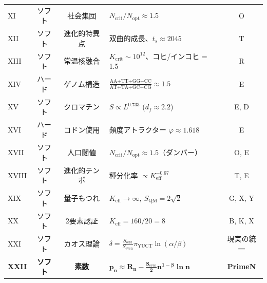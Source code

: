 \documentclass[12pt,a4paper]{article}
\begin{document}
\begin{table}[htbp]
\begin{tabular}{l c c p{3.8cm} c}
		XI  & ソフト & 社会集団 & \(N_{\mathrm{crit}}/N_{\mathrm{opt}} \approx 1.5\) & O \\
		XII & ソフト & 進化的特異点 & 双曲的成長、\(t_s \approx 2045\) & T \\
		XIII& ソフト & 常温核融合 & \(K_{\mathrm{crit}} \sim 10^{12}\)、コヒ/インコヒ = 1.5 & R \\
		XIV & ハード & ゲノム構造 & \(\frac{\text{AA+TT+GG+CC}}{\text{AT+TA+GC+CG}} \approx 1.5\) & E \\
		XV  & ソフト & クロマチン & \(S \propto L^{0.733}\) (\(d_f \approx 2.2\)) & E, D \\
		XVI & ハード & コドン使用 & 頻度アトラクター \(\varphi \approx 1.618\) & E \\
		XVII& ソフト & 人口閾値 & \(N_{\mathrm{crit}}/N_{\mathrm{opt}} \approx 1.5\)（ダンバー） & O, E \\
		XVIII&ソフト & 進化的テンポ & 種分化率 \(\propto K_{\mathrm{eff}}^{-0.67}\) & T, E \\
		XIX & ソフト & 量子もつれ & \(K_{\mathrm{eff}} \to \infty,\ S_{\mathrm{QM}} = 2\sqrt{2}\) & G, X, Y \\
		XX  & ソフト & 2要素認証 & \(K_{\mathrm{eff}} = 160/20 = 8\) & B, K, X \\
		XXI & ソフト & カオス理論 & \(\delta = \frac{S_{\mathrm{odd}}}{S_{\mathrm{even}}} \pi_{\mathrm{YUCT}} \ln(\alpha/\beta)\) & 現実の統一 \\
		\textbf{XXII} & \textbf{ソフト} & \textbf{素数} & \(\mathbf{p_n \approx R_n - \frac{S_{\mathrm{even}}}{2}n^{1-\beta}\ln n}\) & \textbf{PrimeN} \\
		\bottomrule
	\end{tabular}
\end{table}
	
\end{document}
